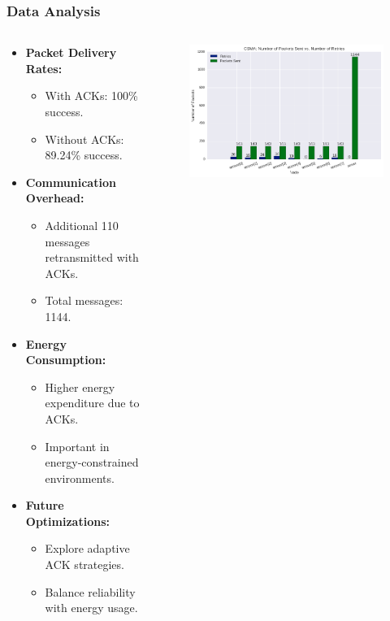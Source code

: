 \begin{frame}
    \frametitle{Data Analysis}
    \begin{columns}[T] %
        \begin{column}{.48\textwidth} %
            \begin{itemize}
                \item \textbf{Packet Delivery Rates:}
                \begin{itemize}
                    \item With ACKs: 100\% success.
                    \item Without ACKs: 89.24\% success.
                \end{itemize}
                \item \textbf{Communication Overhead:}
                \begin{itemize}
                    \item Additional 110 messages retransmitted with ACKs.
                    \item Total messages: 1144.
                \end{itemize}
                \item \textbf{Energy Consumption:}
                \begin{itemize}
                    \item Higher energy expenditure due to ACKs.
                    \item Important in energy-constrained environments.
                \end{itemize}
                \item \textbf{Future Optimizations:}
                \begin{itemize}
                    \item Explore adaptive ACK strategies.
                    \item Balance reliability with energy usage.
                \end{itemize}
            \end{itemize}
        \end{column}
        \begin{column}{.48\textwidth} %
            \begin{figure}
                \centering
                \includegraphics[width=\linewidth]{images/ack.png}

\end{figure}
\end{column}
\end{columns}
\end{frame}
